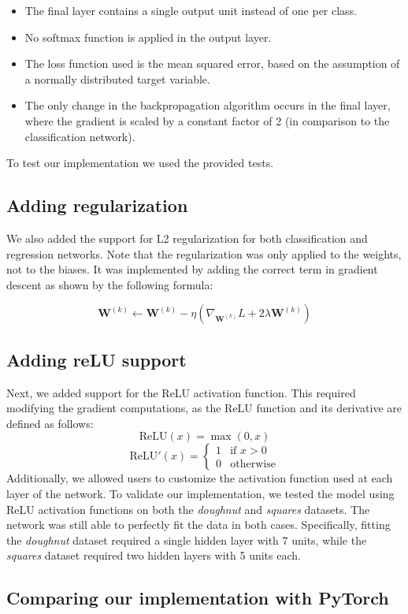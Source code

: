 \documentclass[9pt]{IEEEtran}
\begin{document}
\begin{itemize}
    \item The final layer contains a single output unit instead of one per class.
    \item No softmax function is applied in the output layer.
    \item The loss function used is the mean squared error, based on the assumption of a normally distributed target variable.
    \item The only change in the backpropagation algorithm occurs in the final layer, where the gradient is scaled by a constant factor of 2 (in comparison to the classification network).
\end{itemize}

To test our implementation we used the provided tests.

\subsection{Adding regularization}
We also added the support for L2 regularization for both classification and regression networks. 
Note that the regularization was only applied to the weights, not to the biases.
It was implemented by adding the correct term in gradient descent
  as shown by the following formula:

\[
\mathbf{W}^{(k)} \leftarrow \mathbf{W}^{(k)} - \eta \left( \nabla_{\mathbf{W}^{(k)}} L + 2\lambda \mathbf{W}^{(k)} \right)
\]

\subsection{Adding reLU support}
Next, we added support for the ReLU activation function. This required modifying the gradient computations, as the ReLU function and its derivative are defined as follows:
\[
\text{ReLU}(x) = \max(0, x)
\]
\[
\text{ReLU}'(x) =
\begin{cases}
1 & \text{if } x > 0 \\
0 & \text{otherwise}
\end{cases}
\]
Additionally, we allowed users to customize the activation function used at each layer
 of the network. To validate our implementation, we tested the model using ReLU activation
  functions on both the \textit{doughnut} and \textit{squares} datasets. The network was still
   able to perfectly fit the data in both cases. Specifically, fitting the \textit{doughnut} 
   dataset required a single hidden layer with 7 units, while the \textit{squares} dataset 
   required two hidden layers with 5 units each.

\subsection{Comparing our implementation with PyTorch}



\end{document}
